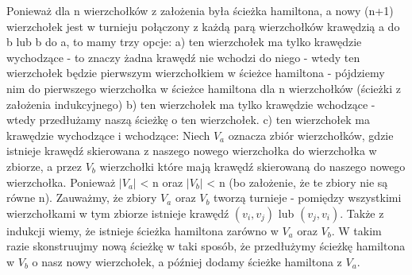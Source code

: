 \documentclass[12pt]{article}
\begin{document}
Ponieważ dla n wierzchołków z założenia była ścieżka hamiltona, a nowy (n+1) wierzchołek jest w turnieju połączony z każdą parą wierzchołków krawędzią a do b lub b do a, to mamy trzy opcje:
a) ten wierzchołek ma tylko krawędzie wychodzące - to znaczy żadna krawędź nie wchodzi do niego - wtedy ten wierzchołek będzie pierwszym wierzchołkiem w ścieżce hamiltona - pójdziemy nim do pierwszego wierzchołka w ścieżce hamiltona dla n wierzchołków (ścieżki z założenia indukcyjnego) 
b) ten wierzchołek ma tylko krawędzie wchodzące - wtedy przedłużamy naszą ścieżkę o ten wierzchołek.
c) ten wierzchołek ma krawędzie wychodzące i wchodzące:
Niech $V_a$ oznacza zbiór wierzchołków, gdzie istnieje krawędź skierowana z naszego nowego wierzchołka do wierzchołka w zbiorze, a przez $V_b$ wierzchołki które mają krawędź skierowaną do naszego nowego wierzchołka. Ponieważ $|V_a|$ < n oraz $|V_b|$ < n (bo założenie, że te zbiory nie są równe n). Zauważmy, że zbiory $V_a$ oraz $V_b$ tworzą turnieje - pomiędzy wszystkimi wierzchołkami w tym zbiorze istnieje krawędź $(v_i, v_j)$ lub $(v_j, v_i)$. Także z indukcji wiemy, że istnieje ścieżka hamiltona zarówno w $V_a$ oraz $V_b$. W takim razie skonstruujmy nową ścieżkę w taki sposób, że przedłużymy ścieżkę hamiltona w $V_b$ o nasz nowy wierzchołek, a później dodamy ścieżke hamiltona z $V_a$. 

\egroup
\end{document}
